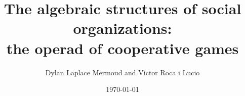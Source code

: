 \documentclass[a4paper,12pt]{amsart}
\title{The algebraic structures of social organizations: \\ the operad of cooperative games}
\author{Dylan Laplace Mermoud \quad and \quad Victor Roca i Lucio}
\date{\today}
\begin{document}
\theoremstyle{plain}
\newtheorem{theorem}{Theorem}%
\newtheorem*{theorem*}{Theorem}
\newtheorem{lemma}{Lemma}%
\newtheorem{proposition}{Proposition}%
\newtheorem{assumption}{Assumption}%
\newtheorem{corollary}{Corollary}%

\theoremstyle{definition}
\newtheorem{definition}{Definition}%
\newtheorem{hypothesis}{Hypothesis}%

\theoremstyle{remark}
\newtheorem{remark}{\sc Remark}%
\newtheorem{example}{\sc Example}%
\newtheorem*{notation}{\sc Notation}



\newcommand{\qi}{\xrightarrow{ \,\smash{\raisebox{-0.65ex}{\ensuremath{\scriptstyle\sim}}}\,}}
\newcommand{\lqi}{\xleftarrow{ \,\smash{\raisebox{-0.65ex}{\ensuremath{\scriptstyle\sim}}}\,}}

\newcommand{\draftnote}[1]{\marginpar{\raggedright\textsf{\hspace{0pt} \tiny #1}}}
\newcommand{\ac}{{\scriptstyle \text{\rm !`}}}

\newcommand{\Ch}{\categ{Ch}}
\newcommand{\Catesmall}{\categ{Cat}_{\categ E, \mathrm{small}}}
\newcommand{\Operade}{\Operad_{\categ E}}
\newcommand{\Operadecprime}{\Operad_{\categ E}}
\newcommand{\Operadesmall}{\Operad_{\categ E, \mathrm{small}}}
\newcommand{\eII}{\mathcal{I}}
\newcommand{\ecateg}[1]{\mathcal{#1}}
\newcommand{\cmonlax}{\categ{CMon}_\lax}
\newcommand{\cmonoplax}{\categ{CMon}_\oplax}
\newcommand{\cmonstrong}{\categ{CMon}_\strong}
\newcommand{\cmonstrict}{\categ{CMon}_\strict}
\newcommand{\cat}{\mathrm{cat}}
\newcommand{\lax}{\mathrm{lax}}
\newcommand{\oplax}{\mathrm{oplax}}
\newcommand{\strong}{\mathrm{strong}}
\newcommand{\strict}{\mathrm{strict}}
\newcommand{\pl}{\mathrm{pl}}
\newcommand{\gr}{\mathrm{gr}}

\newcommand{\Cats}{\mathsf{Cats}}
\newcommand{\Functors}{\mathsf{Functors}}

\newcommand{\Ob}{\mathrm{Ob}}
\newcommand{\tr}{\mathrm{tr}}
\newcommand{\catch}{\mathsf{Ch}}
\newcommand{\categ}[1]{\mathsf{#1}}
\newcommand{\set}[1]{\mathrm{#1}}
\newcommand{\catoperad}[1]{\mathsf{#1}}
\newcommand{\operad}[1]{\mathcal{#1}}
\newcommand{\algebra}[1]{\mathrm{#1}}
\newcommand{\coalgebra}[1]{\mathrm{#1}}
\newcommand{\cooperad}[1]{\mathcal{#1}}
\newcommand{\ocooperad}[1]{\overline{\mathcal{#1}}}
\newcommand{\catofmod}[1]{{#1}\mathrm{-}\mathsf{mod}}
\newcommand{\catofcog}[1]{#1\mathrm{-}\mathsf{cog}}
\newcommand{\catcog}[1]{\Cog\left(#1\right)}
\end{document}
